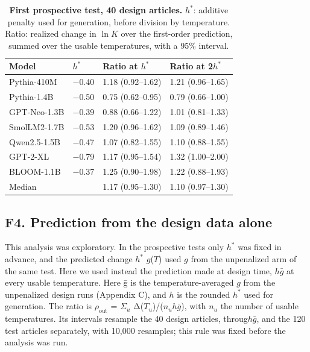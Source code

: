 \documentclass[aps,prx,onecolumn,superscriptaddress,longbibliography]{revtex4-2}
\begin{document}
\begin{table}[htbp]
\centering
\small
\setlength{\tabcolsep}{6pt}
\renewcommand{\thetable}{F4}
\caption{\textbf{First prospective test, 40 design articles.} \(h^*\): additive penalty used for generation, before division by temperature. Ratio: realized change in \(\ln K\) over the first-order prediction, summed over the usable temperatures, with a 95\% interval.}
\label{tabF4}
\begin{tabular}{@{}llll@{}}
\toprule
Model & \(h^*\) & Ratio at \(h^*\) & Ratio at 2\(h^*\) \\
\midrule
Pythia-410M & −0.40 & 1.18 (0.92--1.62) & 1.21 (0.96--1.65) \\
Pythia-1.4B & −0.50 & 0.75 (0.62--0.95) & 0.79 (0.66--1.00) \\
GPT-Neo-1.3B & −0.39 & 0.88 (0.66--1.22) & 1.01 (0.81--1.33) \\
SmolLM2-1.7B & −0.53 & 1.20 (0.96--1.62) & 1.09 (0.89--1.46) \\
Qwen2.5-1.5B & −0.47 & 1.07 (0.82--1.55) & 1.10 (0.88--1.55) \\
GPT-2-XL & −0.79 & 1.17 (0.95--1.54) & 1.32 (1.00--2.00) \\
BLOOM-1.1B & −0.37 & 1.25 (0.90--1.98) & 1.22 (0.88--1.93) \\
Median & & 1.17 (0.95--1.30) & 1.10 (0.97--1.30) \\
\bottomrule
\end{tabular}
\end{table}


\subsection*{F4. Prediction from the design data alone}

This analysis was exploratory. In the prospective tests only \(h^*\) was fixed in advance, and the predicted change \(h^*\) \(g\)(\(T\)) used \(g\) from the unpenalized arm of the same test. Here we used instead the prediction made at design time, \(h\bar{g}\) at every usable temperature. Here ḡ is the temperature-averaged \(g\) from the unpenalized design runs (Appendix C), and \(h\) is the rounded \(h^*\) used for generation. The ratio is \(\rho_{\mathrm{out}}\) = \(\Sigma_{u}\) Δ(\(T_{u}\))/(\(n_u h\bar{g}\)), with \(n_{u}\) the number of usable temperatures. Its intervals resample the 40 design articles, throug\(h\bar{g}\), and the 120 test articles separately, with 10,000 resamples; this rule was fixed before the analysis was run.
\end{document}
